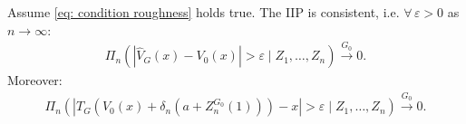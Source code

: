 	\begin{lemma}[Consistency]\label{lemma: consistency chapter3}
		Assume \eqref{eq: condition roughness} holds true. The IIP is consistent, i.e. $\forall \, \varepsilon >0$ as $n \rightarrow \infty$:
		\begin{align}\label{eq: consistency}
			\Pi_n (| \hat{V}_{\scriptscriptstyle{G}}(x) - V_0(x)| > \varepsilon \mid Z_1,\ldots, Z_n) \stackrel{G_0}{\rightarrow} 0.
		\end{align}
		Moreover:
		\begin{align}\label{eq: consistency IIP}
			\Pi_n \left( \left| T_{\scriptscriptstyle{G}} \left( V_0(x) + \delta_n  (a + Z^{\scriptscriptstyle{G_0}}_n(1)) \right) - x \right| > \varepsilon \mid Z_1, \ldots, Z_n \right) \stackrel{G_0}{\to} 0.
		\end{align}
	\end{lemma}
